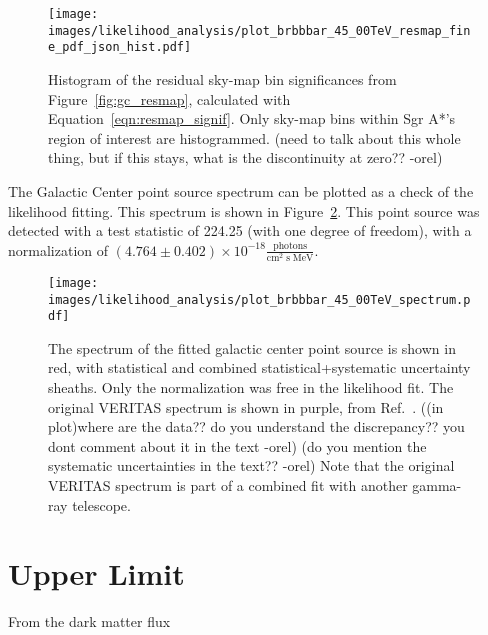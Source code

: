   \begin{figure}[ht]
    \centering
    \texttt{[image: images/likelihood\_analysis/plot\_brbbbar\_45\_00TeV\_resmap\_fine\_pdf\_json\_hist.pdf]}
    \caption[Galactic Center Residual Histogram]
    {
      Histogram of the residual sky-map bin significances from Figure~\ref{fig:gc_resmap}, calculated with Equation~\ref{eqn:resmap_signif}.
      Only sky-map bins within Sgr A*'s region of interest are histogrammed.
      {\color{red}(need to talk about this whole thing, but if this stays, what is the discontinuity at zero?? -orel)}
    }
    \label{fig:gc_resmap_sighist}
  \end{figure}


  The Galactic Center point source spectrum can be plotted as a check of the likelihood fitting.
  This spectrum is shown in Figure~\ref{fig:gc_pntsrc_spectrum}.
  This point source was detected with a test statistic of 224.25 (with one degree of freedom), with a normalization of $(4.764\pm0.402)\times 10^{-18} \frac{\textrm{photons}}{\textrm{cm}^2\;\textrm{s}\;\textrm{MeV}}$.
  

  \begin{figure}[ht]
    \centering
    \texttt{[image: images/likelihood\_analysis/plot\_brbbbar\_45\_00TeV\_spectrum.pdf]}
    \caption[Galactic Center Point Source Spectrum]
    {
      The spectrum of the fitted galactic center point source is shown in red, with statistical and combined statistical+systematic uncertainty sheaths.
      Only the normalization was free in the likelihood fit.
      The original VERITAS spectrum is shown in purple, from Ref.~\cite{VeritasGCRidge2015}.
      {\color{red}((in plot)where are the data?? do you understand the discrepancy?? you dont comment about it in the text -orel)}
      {\color{red}(do you mention the systematic uncertainties in the text?? -orel)}
      Note that the original VERITAS spectrum is part of a combined fit with another gamma-ray telescope.
    }
    \label{fig:gc_pntsrc_spectrum}
  \end{figure}
  
  
\section{Upper Limit}\label{upper_limit}
  From the dark matter flux 


